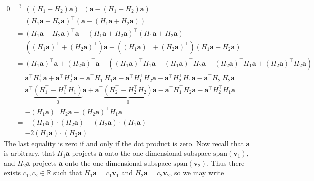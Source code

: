 \documentclass[12pt, a4paper]{article}
\theoremstyle{definition}
\begin{document}
	\begin{align}
		0 &\stackrel{?}{=}( (H_1+H_2)\mathbf{a} )^\top(\mathbf{a} - (H_1+H_2)\mathbf{a})
		\tag{Unverified conjecture}\nonumber\\
		  &=( H_1\mathbf{a} + H_2\mathbf{a} )^\top(\mathbf{a} - (H_1\mathbf{a} + H_2\mathbf{a}))
		  \tag{Linearity}\nonumber\\
		  &=(H_1\textbf{a}+H_2\mathbf{a})^\top \mathbf{a} -
		  (H_1\textbf{a}+H_2\mathbf{a})^\top (H_1\mathbf{a} + H_2\mathbf{a})
		  \tag{Distributivity}\nonumber\\
		  &=((H_1\textbf{a})^\top+(H_2\textbf{a})^\top) \mathbf{a} -
		  ((H_1\textbf{a})^\top+(H_2\mathbf{a})^\top) (H_1\mathbf{a} + H_2\mathbf{a})
		  \tag{$(A+B)^\top=A^\top+B^\top$}\nonumber\\
		  &=(H_1\mathbf{a})^\top \mathbf{a} + (H_2\mathbf{a})^\top\mathbf{a}
		  -( (H_1\mathbf{a})^\top H_1\mathbf{a} + (H_1\mathbf{a})^\top H_2\mathbf{a}
		    + (H_2\mathbf{a})^\top H_1\mathbf{a} + (H_2\mathbf{a})^\top H_2\mathbf{a} )\nonumber\\
		  &=\mathbf{a}^\top H_1^\top\mathbf{a}  + \mathbf{a}^\top H_2^\top\mathbf{a}
		  -\mathbf{a}^\top H_1^\top H_1\mathbf{a} - \mathbf{a}^\top H_1^\top H_2\mathbf{a}
		  -\mathbf{a}^\top H_2^\top H_1\mathbf{a} - \mathbf{a}^\top H_2^\top H_2\mathbf{a}
		  \nonumber\\
		  &=\mathbf{a}^\top \underbrace{(H_1^\top -H_1^\top H_1)}_{0}\mathbf{a}
		  +\mathbf{a}^\top\underbrace{(H_2^\top -H_2^\top H_2)}_{0}\mathbf{a}
		  -\mathbf{a}^\top H_1^\top H_2\mathbf{a}
		  -\mathbf{a}^\top H_2^\top H_1\mathbf{a}\nonumber\\
		  &=-(H_1\mathbf{a})^\top H_2\mathbf{a} -(H_2\mathbf{a})^\top H_1\mathbf{a}
		  \tag{$H_1$ and $H_2$ are idempotent and symmetric}\\
		  &=-(H_1\mathbf{a})\cdot (H_2\mathbf{a}) - (H_2\mathbf{a})\cdot (H_1\mathbf{a})
		  \tag{Definition of dot product}\\
		  &=-2(H_1\mathbf{a})\cdot (H_2\mathbf{a})
		  \tag{Dot product is commutative}
	\end{align}
	The last equality is zero if and only if the dot product is zero.
	Now recall that $\mathbf{a}$ is arbitrary, that $H_1\mathbf{a}$ projects $\mathbf{a}$
	onto the one-dimensional subspace $\text{span}(\mathbf{v}_1)$, and $H_2\mathbf{a}$ projects
	$\mathbf{a}$ onto the one-dimensional subspace $\text{span}(\mathbf{v}_2)$. Thus
	there exists $c_1,c_2\in\mathbb{R}$ such that $H_1\mathbf{a}=c_1\mathbf{v}_1$ and
	$H_2\mathbf{a}=c_2\mathbf{v}_2$, so we may write
\end{document}
